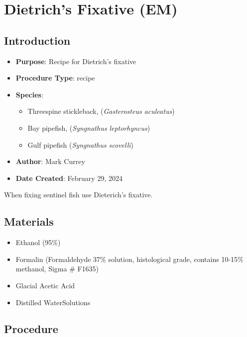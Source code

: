 \documentclass[
  letterpaper,
  DIV=11,
  numbers=noendperiod]{scrreprt}
\providecommand{\tightlist}{%
  \setlength{\itemsep}{0pt}\setlength{\parskip}{0pt}}\usepackage{longtable,booktabs,array}
\begin{document}
\hypertarget{sec-recipe-dietrichs_fix}{%
\chapter{Dietrich's Fixative (EM)}\label{sec-recipe-dietrichs_fix}}

\hypertarget{introduction-92}{%
\section{Introduction}\label{introduction-92}}

\begin{itemize}
\tightlist
\item
  \textbf{Purpose}: Recipe for Dietrich's fixative
\item
  \textbf{Procedure Type}: recipe
\item
  \textbf{Species}:

  \begin{itemize}
  \tightlist
  \item
    Threespine stickleback, (\emph{Gasterosteus aculeatus})
  \item
    Bay pipefish, (\emph{Syngnathus leptorhyncus})
  \item
    Gulf pipefish (\emph{Syngnathus scovelli})
  \end{itemize}
\item
  \textbf{Author}: Mark Currey
\item
  \textbf{Date Created}: February 29, 2024
\end{itemize}

When fixing sentinel fish use Dieterich's fixative.

\hypertarget{materials-87}{%
\section{Materials}\label{materials-87}}

\begin{itemize}
\tightlist
\item
  Ethanol (95\%)
\item
  Formalin (Formaldehyde 37\% solution, histological grade, contains
  10-15\% methanol, Sigma \# F1635)
\item
  Glacial Acetic Acid
\item
  Distilled WaterSolutions
\end{itemize}

\hypertarget{procedure-86}{%
\section{Procedure}\label{procedure-86}}
\end{document}
